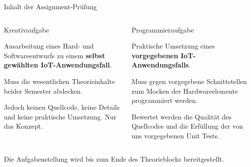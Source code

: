 {
\small

\begin{frame}{Inhalt der Assignment-Prüfung}
    \begin{columns}[onlytextwidth]
        \begin{block}{Kreativaufgabe}
            \medskip
            \parbox{\linewidth}{
                Ausarbeitung eines Hard- und Softwareentwurfs zu einem \textbf{selbst gewählten IoT-Anwendungsfall}.
                \medskip

                Muss die wesentlichen Theorieinhalte beider Semester abdecken.
                \medskip

                Jedoch keinen Quellcode, keine Details und keine praktische Umsetzung. Nur das Konzept.
            }
        \end{block}

        \begin{block}{Programmieraufgabe}
            \medskip
            \parbox{\linewidth}{
                Praktische Umsetzung eines \textbf{vorgegebenen IoT-Anwendungsfalls}.
                \medskip

                Muss gegen vorgegebene Schnittstellen zum Mocken der Hardwareelemente
                programmiert werden.
                \medskip

                Bewertet werden die Qualität des Quellcodes und die Erfüllung der von
                uns vorgegebenen Unit Tests.
            }
        \end{block}
    \end{columns}

    \bigskip
    \bigskip
    {
        \normalsize
        Die Aufgabenstellung wird bis zum Ende des Theorieblocks bereitgestellt.
    }
\end{frame}
}

